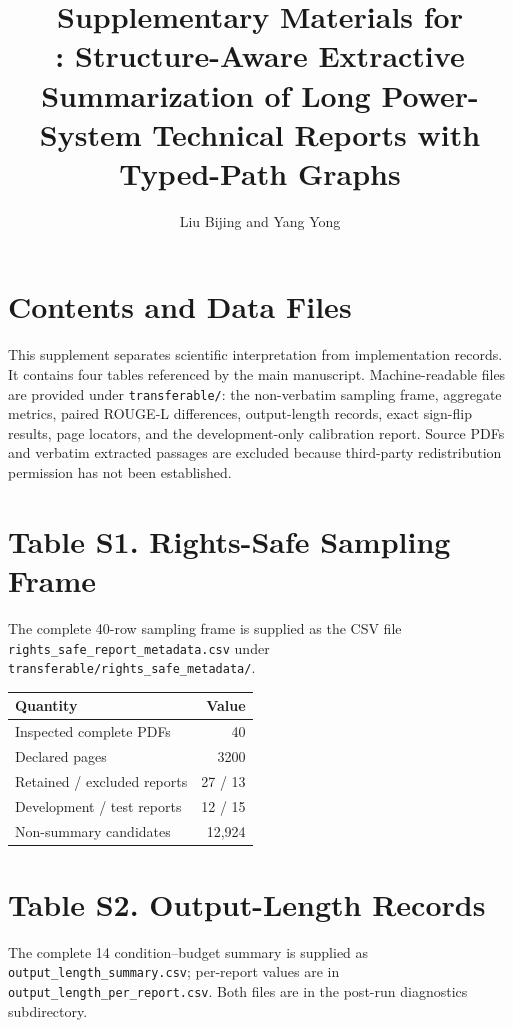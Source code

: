 \documentclass[11pt]{article}
\title{Supplementary Materials for\\
\cges{}: Structure-Aware Extractive Summarization of Long Power-System Technical Reports with Typed-Path Graphs}
\author{Liu Bijing and Yang Yong}
\date{}
\begin{document}
\maketitle

\section*{Contents and Data Files}

This supplement separates scientific interpretation from implementation records. It contains four tables referenced by the main manuscript. Machine-readable files are provided under \texttt{transferable/}: the non-verbatim sampling frame, aggregate metrics, paired ROUGE-L differences, output-length records, exact sign-flip results, page locators, and the development-only calibration report. Source PDFs and verbatim extracted passages are excluded because third-party redistribution permission has not been established.

\section*{Table S1. Rights-Safe Sampling Frame}

The complete 40-row sampling frame is supplied as the CSV file \texttt{rights\_safe\_report\_metadata.csv} under \texttt{transferable/rights\_safe\_metadata/}.

\begin{center}
\begin{tabular}{lr}
\toprule
Quantity & Value\\
\midrule
Inspected complete PDFs & 40\\
Declared pages & 3200\\
Retained / excluded reports & 27 / 13\\
Development / test reports & 12 / 15\\
Non-summary candidates & 12,924\\
\bottomrule
\end{tabular}
\end{center}

\section*{Table S2. Output-Length Records}

The complete 14 condition--budget summary is supplied as \texttt{output\_length\_summary.csv}; per-report values are in \texttt{output\_length\_per\_report.csv}. Both files are in the post-run diagnostics subdirectory.
\end{document}
